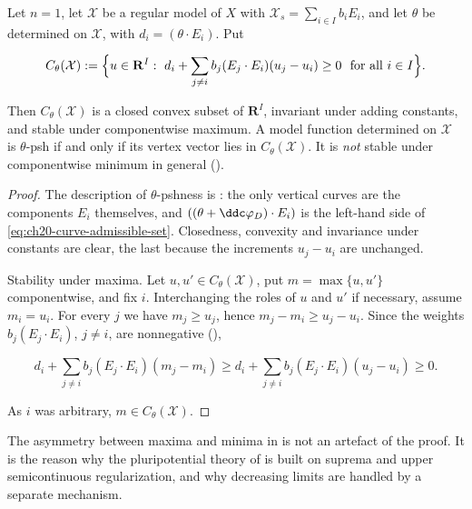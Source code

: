 \begin{proposition}
\label{prop:ch20-curve-lattice}
Let $n=1$, let $\mathcal X$ be a regular model of $X$ with
$\mathcal X_s=\sum_{i\in I}b_iE_i$, and let $\theta$ be determined on
$\mathcal X$, with $d_i=(\theta\cdot E_i)$.  Put

\begin{equation}
\label{eq:ch20-curve-admissible-set}
 C_\theta(\mathcal X):=
 \Bigl\{u\in\mathbf R^I:\ d_i+\sum_{j\neq i}b_j(E_j\cdot E_i)(u_j-u_i)
   \geq0\ \text{ for all }i\in I\Bigr\}.
\end{equation}

Then $C_\theta(\mathcal X)$ is a closed convex subset of $\mathbf R^I$,
invariant under adding constants, and stable under componentwise maximum.  A
model function determined on $\mathcal X$ is $\theta$-psh if and only if
its vertex vector lies in $C_\theta(\mathcal X)$.  It is \emph{not} stable
under componentwise minimum in general
\textup{()}.
\end{proposition}

\begin{proof}
The description of $\theta$-pshness is
: the only vertical curves are the
components $E_i$ themselves, and $((\theta+\ddc\varphi_D)\cdot E_i)$ is
the left-hand side of \eqref{eq:ch20-curve-admissible-set}.  Closedness,
convexity and invariance under constants are clear, the last because the
increments $u_j-u_i$ are unchanged.

Stability under maxima.  Let $u,u'\in C_\theta(\mathcal X)$, put
$m=\max\{u,u'\}$ componentwise, and fix $i$.  Interchanging the roles of
$u$ and $u'$ if necessary, assume $m_i=u_i$.  For every $j$ we have
$m_j\geq u_j$, hence $m_j-m_i\geq u_j-u_i$.  Since the weights
$b_j(E_j\cdot E_i)$, $j\neq i$, are nonnegative
(),

\begin{equation}
\label{eq:ch20-curve-max-monotone}
 d_i+\sum_{j\neq i}b_j(E_j\cdot E_i)(m_j-m_i)
 \geq
 d_i+\sum_{j\neq i}b_j(E_j\cdot E_i)(u_j-u_i)\geq0 .
\end{equation}

As $i$ was arbitrary, $m\in C_\theta(\mathcal X)$.
\end{proof}

The asymmetry between maxima and minima in
 is not an artefact of the proof.  It is the
reason why the pluripotential theory of
 is built on suprema and upper
semicontinuous regularization, and why decreasing limits are handled by a
separate mechanism.

